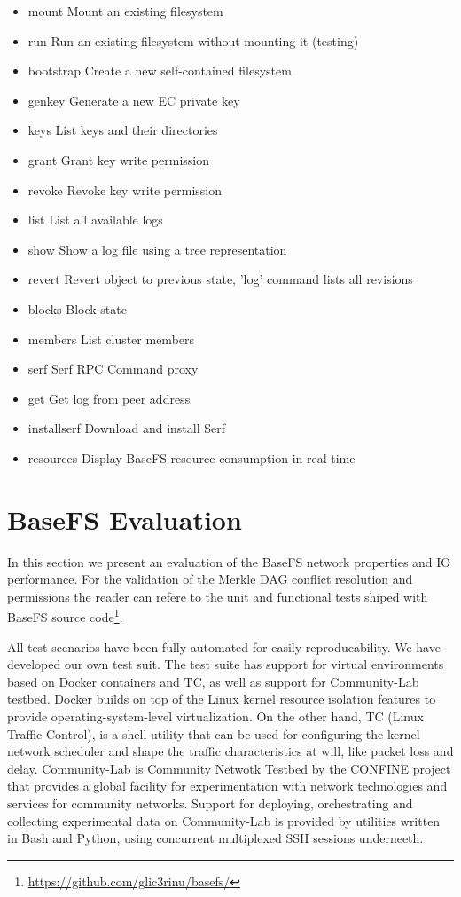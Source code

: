 \documentclass{sig-alternate}
\begin{document}
\begin{itemize}
 \item mount	Mount an existing filesystem
 \item run		Run an existing filesystem without mounting it (testing)
 \item bootstrap	Create a new self-contained filesystem
 \item genkey	Generate a new EC private key
 \item keys	List keys and their directories
 \item grant	Grant key write permission
 \item revoke	Revoke key write permission
 \item list	List all available logs
 \item show	Show a log file using a tree representation
 \item revert	Revert object to previous state, 'log' command lists all revisions
 \item blocks	Block state
 \item members	List cluster members
 \item serf	Serf RPC Command proxy
 \item get		Get log from peer address
 \item installserf	Download and install Serf
 \item resources	Display BaseFS resource consumption in real-time
\end{itemize}


\section{BaseFS Evaluation}



In this section we present an evaluation of the BaseFS network properties and IO performance. For the validation of the Merkle DAG conflict resolution and permissions the reader can refere to the unit and functional tests shiped with BaseFS source code\footnote{\url{https://github.com/glic3rinu/basefs/}}.

All test scenarios have been fully automated for easily reproducability. We have developed our own test suit. The test suite has support for virtual environments based on Docker containers and TC, as well as support for Community-Lab testbed. Docker builds on top of the Linux kernel resource isolation features to provide operating-system-level virtualization. On the other hand, TC (Linux Traffic Control), is a shell utility that can be used for configuring the kernel network scheduler and shape the traffic characteristics at will, like packet loss and delay. Community-Lab is Community Netwotk Testbed by the CONFINE project that provides a global facility for experimentation with network technologies and services for community networks. Support for deploying, orchestrating and collecting experimental data on Community-Lab is provided by utilities written in Bash and Python, using concurrent multiplexed SSH sessions underneeth.
\end{document}
